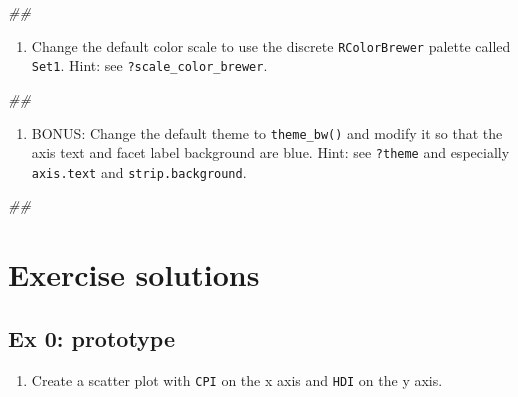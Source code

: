 \documentclass[]{book}
\newenvironment{Shaded}{\begin{snugshade}}{\end{snugshade}}
\newcommand{\CommentTok}[1]{\textcolor[rgb]{0.56,0.35,0.01}{\textit{#1}}}
\providecommand{\tightlist}{%
  \setlength{\itemsep}{0pt}\setlength{\parskip}{0pt}}
\begin{document}
\begin{Shaded}
\begin{Highlighting}[]
\CommentTok{## }
\end{Highlighting}
\end{Shaded}

\begin{enumerate}
\def\labelenumi{\arabic{enumi}.}
\setcounter{enumi}{4}
\tightlist
\item
  Change the default color scale to use the discrete \texttt{RColorBrewer} palette called \texttt{Set1}. Hint: see \texttt{?scale\_color\_brewer}.
\end{enumerate}

\begin{Shaded}
\begin{Highlighting}[]
\CommentTok{## }
\end{Highlighting}
\end{Shaded}

\begin{enumerate}
\def\labelenumi{\arabic{enumi}.}
\setcounter{enumi}{5}
\tightlist
\item
  BONUS: Change the default theme to \texttt{theme\_bw()} and modify it so that the axis text and facet label background are blue. Hint: see \texttt{?theme} and especially \texttt{axis.text} and \texttt{strip.background}.
\end{enumerate}

\begin{Shaded}
\begin{Highlighting}[]
\CommentTok{## }
\end{Highlighting}
\end{Shaded}

\hypertarget{exercise-solutions-2}{%
\section{Exercise solutions}\label{exercise-solutions-2}}

\hypertarget{ex-0-prototype-2}{%
\subsection{Ex 0: prototype}\label{ex-0-prototype-2}}

\begin{enumerate}
\def\labelenumi{\arabic{enumi}.}
\tightlist
\item
  Create a scatter plot with \texttt{CPI} on the x axis and \texttt{HDI} on the y axis.
\end{enumerate}
\end{document}
